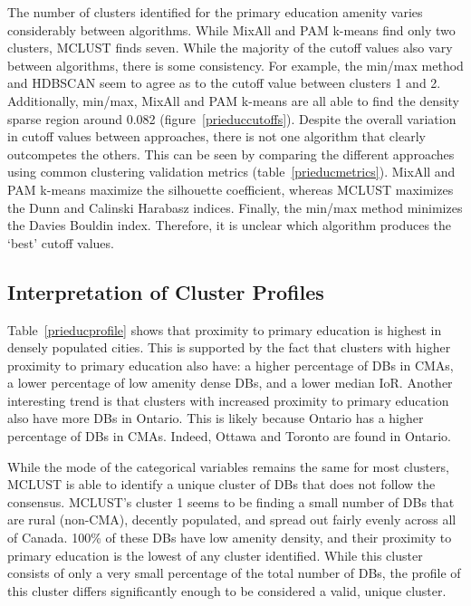 \documentclass[11pt, a4paper]{article}
\begin{document}
The number of clusters identified for the primary education amenity varies considerably between algorithms. While MixAll and PAM k-means find only two clusters, MCLUST finds seven. While the majority of the cutoff values also vary between algorithms, there is some consistency. For example, the min/max method and HDBSCAN seem to agree as to the cutoff value between clusters 1 and 2. Additionally, min/max, MixAll and PAM k-means are all able to find the density sparse region around 0.082 (figure~\ref{prieduccutoffs}). Despite the overall variation in cutoff values between approaches, there is not one algorithm that clearly outcompetes the others. This can be seen by comparing the different approaches using common clustering validation metrics (table~\ref{prieducmetrics}). MixAll and PAM k-means maximize the silhouette coefficient, whereas MCLUST maximizes the Dunn and Calinski Harabasz indices. Finally, the min/max method minimizes the Davies Bouldin index. Therefore, it is unclear which algorithm produces the `best’ cutoff values.







\subsection{Interpretation of Cluster Profiles}

Table~\ref{prieducprofile} shows that proximity to primary education is highest in densely populated cities. This is supported by the fact that clusters with higher proximity to primary education also have: a higher percentage of DBs in CMAs, a lower percentage of low amenity dense DBs, and a lower median IoR. Another interesting trend is that clusters with increased proximity to primary education also have more DBs in Ontario. This is likely because Ontario has a higher percentage of DBs in CMAs. Indeed, Ottawa and Toronto are found in Ontario.
\par
While the mode of the categorical variables remains the same for most clusters, MCLUST is able to identify a unique cluster of DBs that does not follow the consensus. MCLUST’s cluster 1 seems to be finding a small number of DBs that are rural (non-CMA), decently populated, and spread out fairly evenly across all of Canada. 100\% of these DBs have low amenity density, and their proximity to primary education is the lowest of any cluster identified. While this cluster consists of only a very small percentage of the total number of DBs, the profile of this cluster differs significantly enough to be considered a valid, unique cluster.
\end{document}
